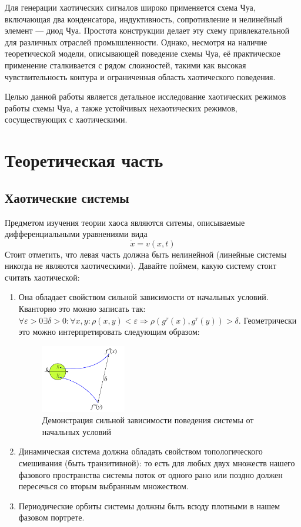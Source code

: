 \documentclass[12pt]{article}
\begin{document}
Для генерации хаотических сигналов широко применяется схема Чуа, включающая два конденсатора,
индуктивность, сопротивление и нелинейный элемент --- диод Чуа.
Простота конструкции делает эту схему привлекательной для различных отраслей промышленности.
Однако, несмотря на наличие теоретической модели, описывающей поведение схемы Чуа,
её практическое применение сталкивается с рядом сложностей, такими как высокая чувствительность контура и
ограниченная область хаотического поведения.

Целью данной работы является детальное исследование хаотических режимов работы схемы Чуа,
а также устойчивых нехаотических режимов, сосуществующих с хаотическими.

\section*{Теоретическая часть}
\subsection*{Хаотические системы}
Предметом изучения теории хаоса являются ситемы, описываемые дифференциальными уравнениями вида $$\dot{x} = v(x,t)$$
Стоит отметить, что левая часть должна быть нелинейной (линейные системы никогда не являются хаотическими). Давайте поймем, какую систему стоит считать хаотической:
\begin{enumerate}
	\item Она обладает свойством сильной зависимости от начальных условий. Кванторно это можно записать так: $\forall \varepsilon > 0 \exists \delta > 0: \forall x,y :  \rho(x,y) < \varepsilon \Rightarrow \rho(g^{\tau}(x),g^{\tau}(y)) > \delta$.
	      Геометрически это можно интерпретировать следующим образом:
	      \begin{figure}[H]
		      \centering
		      \includegraphics[width=0.35\textwidth]{dependance_st_pos.png}
		      \caption{Демонстрация сильной зависимости поведения системы от начальных условий}
		      \label{fig:demonstrate_dependance}
	      \end{figure}
	\item Динамическая система должна обладать свойством топологического смешивания (быть транзитивной): то есть для любых двух множеств нашего фазового пространства системы поток от одного рано или поздно должен пересечься со вторым выбранным множеством.
	\item Периодические орбиты системы должны быть всюду плотными в нашем фазовом портрете.
\end{enumerate}
\end{document}
